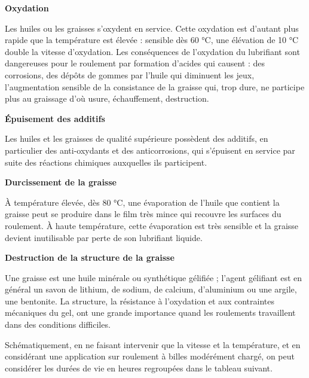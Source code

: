 \vspace{0.3cm}
\textbf{Oxydation}
\vspace{0.3cm} 

Les huiles ou les graisses s’oxydent en service. Cette oxydation est d’autant plus rapide que la température est élevée : sensible dès 60 °C, une élévation de 10 °C double la vitesse d’oxydation.
Les conséquences de l’oxydation du lubrifiant sont dangereuses pour le roulement par formation d’acides qui causent : des corrosions, des dépôts de gommes par l’huile qui diminuent les jeux, l’augmentation sensible de la consistance de la graisse qui, trop dure, ne participe plus au graissage d’où usure, échauffement, destruction.


\vspace{0.3cm} 
\textbf{Épuisement des additifs}
\vspace{0.3cm}

Les huiles et les graisses de qualité supérieure possèdent des additifs, en particulier des anti-oxydants et des anticorrosions, qui s’épuisent en service par suite des réactions chimiques auxquelles ils participent.


\vspace{0.3cm}
\textbf{Durcissement de la graisse}
\vspace{0.3cm}

À température élevée, dès 80 °C, une évaporation de l’huile que contient la graisse peut se produire dans le film très mince qui recouvre les surfaces du roulement. À haute température, cette évaporation est très sensible et la graisse devient inutilisable par perte de son lubrifiant liquide.

\vspace{0.3cm} 
\textbf{Destruction de la structure de la graisse}
\vspace{0.3cm} 

Une graisse est une huile minérale ou synthétique gélifiée ; l’agent gélifiant est en général un savon de lithium, de sodium, de calcium, d’aluminium ou une argile, une bentonite. La structure, la résistance à l’oxydation et aux contraintes mécaniques du gel, ont une grande importance quand les roulements travaillent dans des conditions difficiles.
\vspace{0.3cm}

Schématiquement, en ne faisant intervenir que la vitesse et la température, et en considérant une application sur roulement à billes modérément chargé, on peut considérer les durées de vie en heures regroupées dans le tableau suivant. 
\vspace{0.3cm}

